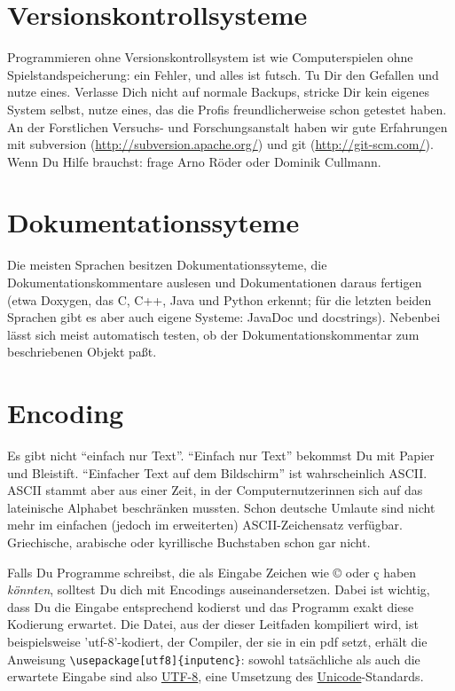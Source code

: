 \documentclass[twoside]{scrreprt}
\providecommand{\FVA}[1]{Forstliche#1 Versuchs- und Forschungsanstalt}
\begin{document}
\section{Versionskontrollsysteme\label{sec:vcs}}
Programmieren ohne Versionskontrollsystem ist wie Computerspielen ohne
Spielstandspeicherung: ein Fehler, und alles ist futsch.
Tu Dir den Gefallen und nutze eines.
Verlasse Dich nicht auf normale Backups, stricke Dir kein eigenes System selbst,
nutze eines, das die Profis freundlicherweise schon getestet haben.
An der \FVA{n} haben wir gute Erfahrungen mit
subversion (\url{http://subversion.apache.org/})
und git (\url{http://git-scm.com/}).
Wenn Du Hilfe brauchst: frage Arno R\"o{}der oder Dominik Cullmann. 

\section{Dokumentationssyteme\label{sec:doxygen}}
Die meisten Sprachen besitzen Dokumentationssyteme, die Dokumentationskommentare
auslesen und Dokumentationen daraus fertigen (etwa Doxygen, das C, C++, Java und
Python erkennt; f\"u{}r die letzten beiden Sprachen gibt es aber auch eigene
Systeme: JavaDoc und docstrings).
Nebenbei l\"a{}sst sich meist automatisch testen, ob der
Dokumentationskommentar zum beschriebenen Objekt pa\ss{}t.

\section{Encoding}
Es gibt nicht "`einfach nur Text"'. "`Einfach nur Text"' bekommst Du mit Papier
und Bleistift. "`Einfacher Text auf dem Bildschirm"' ist wahrscheinlich
ASCII. ASCII stammt aber aus einer Zeit, in der Computernutzerinnen sich auf das
lateinische Alphabet beschr\"a{}nken mussten. 
Schon deutsche Umlaute sind nicht
mehr im einfachen (jedoch im erweiterten) ASCII-Zeichensatz verf\"u{}gbar.
Griechische, arabische oder kyrillische Buchstaben schon gar nicht.


Falls Du Programme schreibst, die als Eingabe Zeichen wie ©  oder ç haben
\emph{k\"o{}nnten}, solltest Du dich mit Encodings auseinandersetzen. Dabei
ist wichtig, dass Du die Eingabe entsprechend kodierst und das Programm exakt
diese Kodierung erwartet. Die Datei, aus der dieser Leitfaden kompiliert
wird, ist beispielsweise 'utf-8'-kodiert, der Compiler, der sie in ein pdf
setzt, erh\"a{}lt die Anweisung \verb+\usepackage[utf8]{inputenc}+: sowohl
tats\"a{}chliche als auch die erwartete Eingabe sind also
\href{http://en.wikipedia.org/wiki/UTF-8}{UTF-8}, eine Umsetzung des
\href{http://en.wikipedia.org/wiki/Unicode}{Unicode}-Standards.
\end{document}
